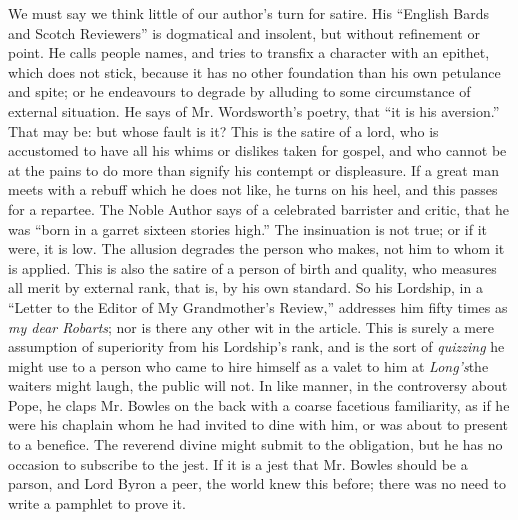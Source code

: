 We must say we think little of our author's turn for satire. His
``English Bards and Scotch Reviewers'' is dogmatical and insolent, but
without refinement or point. He calls people names, and tries to
transfix a character with an epithet, which does not stick, because
it has no other foundation than his own petulance and spite; or he
endeavours to degrade by alluding to some circumstance of external
situation. He says of Mr. Wordsworth's poetry, that ``it is his
aversion.'' That may be: but whose fault is it? This is the satire of
a lord, who is accustomed to have all his whims or dislikes taken for
gospel, and who cannot be at the pains to do more than signify his
contempt or displeasure. If a great man meets with a rebuff which he
does not like, he turns on his heel, and this passes for a repartee.
The Noble Author says of a celebrated barrister and critic, that he was
``born in a garret sixteen stories high.'' The insinuation is not true; or
if it were, it is low. The allusion degrades the person who makes, not
him to whom it is applied. This is also the satire of a person of birth
and quality, who measures all merit by external rank, that is, by
his own standard. So his Lordship, in a ``Letter to the Editor of My
Grandmother's Review,'' addresses him fifty times as \emph{my dear Robarts};
nor is there any other wit in the article. This is surely a mere
assumption of superiority from his Lordship's rank, and is the sort of
\emph{quizzing} he might use to a person who came to hire himself as a valet
to him at \emph{Long's}\textemdash the waiters might laugh, the public will not. In
like manner, in the controversy about Pope, he claps Mr. Bowles on the
back with a coarse facetious familiarity, as if he were his chaplain
whom he had invited to dine with him, or was about to present to a
benefice. The reverend divine might submit to the obligation, but he has
no occasion to subscribe to the jest. If it is a jest that Mr. Bowles
should be a parson, and Lord Byron a peer, the world knew this before;
there was no need to write a pamphlet to prove it.

